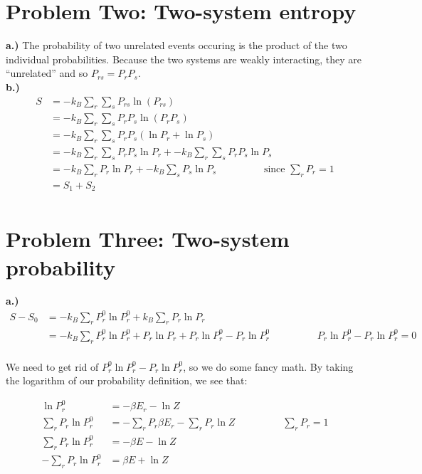 \documentclass[10pt]{article} %
\begin{document}
\section{Problem Two: Two-system entropy}
\textbf{a.)} The probability of two unrelated events occuring is the product of the
two individual probabilities. Because the two systems are weakly interacting,
they are ``unrelated'' and so $P_{rs} = P_rP_s$.\\

\textbf{b.)}
\begin{align*}
  S &= -k_B\sum_r \sum_s P_{rs} \ln\left(P_{rs}\right)\\
  &= -k_B\sum_r \sum_s P_rP_s \ln\left(P_rP_s\right)\\
  &= -k_B\sum_r \sum_s P_rP_s\left(\ln P_r + \ln P_s\right)\\
  &= -k_B\sum_r \sum_s P_rP_s\ln P_r + -k_B\sum_r \sum_s P_rP_s\ln P_s\\
  &= -k_B\sum_r P_r\ln P_r + -k_B\sum_s P_s\ln P_s
  \hspace{2cm}\mbox{since }\sum_rP_r = 1\\
  &= S_1 + S_2\\
\end{align*}

\section{Problem Three: Two-system probability}
\textbf{a.)}
\begin{align*}
  S - S_0 &= -k_B\sum_rP_r^0\ln P_r^0 + k_B\sum_rP_r\ln P_r\\
  &= -k_B\sum_rP_r^0\ln P_r^0 + P_r\ln P_r + P_r\ln P_r^0 - P_r\ln P_r^0
  \hspace{2cm}P_r\ln P_r^0 - P_r\ln P_r^0=0\\
\end{align*}

We need to get rid of $P_r^0\ln P_r^0 - P_r\ln P_r^0$, so we do some fancy math. By taking
the logarithm of our probability definition, we see that:

\begin{align*}
  \ln P_r^0 &= -\beta E_r - \ln Z\\
  \sum_r P_r\ln P_r^0 &= -\sum_r P_r\beta E_r - \sum_r P_r\ln Z
  \hspace{2cm}\sum_r P_r=1\\
  \sum_r P_r\ln P_r^0 &= -\beta E - \ln Z\\
  -\sum_r P_r\ln P_r^0 &= \beta E + \ln Z\\
\end{align*}
\end{document}
